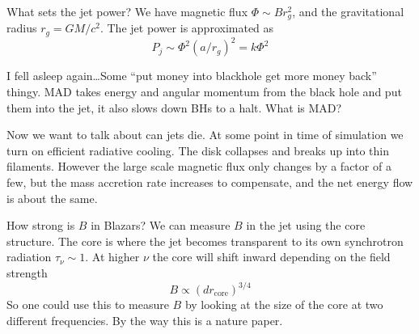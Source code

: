 \documentclass[letterpaper, 11pt]{article}
\numberwithin{equation}{section}
\numberwithin{figure}{section}
\begin{document}
What sets the jet power? We have magnetic flux $\Phi \sim B r_{g}^2$, and the
gravitational radius $r_{g} = GM/c^2$. The jet power is approximated as
\begin{equation}
  \label{eq:17}
  P_j \sim \Phi^2(a / r_{g})^2 = k\Phi^2
\end{equation}

I fell asleep again\dots Some ``put money into blackhole get more money back''
thingy. MAD takes energy and angular momentum from the black hole and put them
into the jet, it also slows down BHs to a halt. What is MAD?

Now we want to talk about can jets die. At some point in time of simulation we
turn on efficient radiative cooling. The disk collapses and breaks up into thin
filaments. However the large scale magnetic flux only changes by a factor of a
few, but the mass accretion rate increases to compensate, and the net energy
flow is about the same.

How strong is $B$ in Blazars? We can measure $B$ in the jet using the core
structure. The core is where the jet becomes transparent to its own synchrotron
radiation $\tau_{\nu}\sim 1$. At higher $\nu$ the core will shift inward
depending on the field strength
\begin{equation}
  \label{eq:18}
  B\propto (dr_\mathrm{core})^{3/4}
\end{equation}
So one could use this to measure $B$ by looking at the size of the core at two
different frequencies. By the way this is a nature paper.
\end{document}
